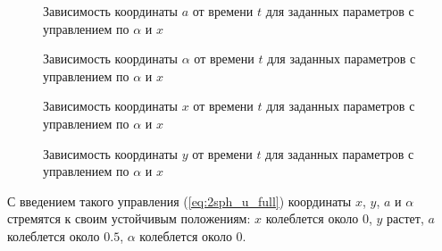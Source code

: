\begin{figure}[H]
	\caption{Зависимость координаты $a$ от времени $t$ для заданных параметров с управлением по $\alpha$ и $x$}
	\label{ris:2sph_a_full_u}
\end{figure}
\begin{figure}[H]
	\caption{Зависимость координаты $\alpha$ от времени $t$ для заданных параметров с управлением по $\alpha$ и $x$}
	\label{ris:2sph_alpha_full_u}
\end{figure} 
\begin{figure}[H]
	\caption{Зависимость координаты $x$ от времени $t$ для заданных параметров с управлением по $\alpha$ и $x$}
	\label{ris:2sph_x_full_u}
\end{figure} 
\begin{figure}[H]
	\caption{Зависимость координаты $y$ от времени $t$ для заданных параметров с управлением по $\alpha$ и $x$}
	\label{ris:2sph_y_full_u}
\end{figure} 

С введением такого управления (\ref{eq:2sph_u_full}) координаты $x$, $y$, $a$ и $\alpha$ стремятся к своим устойчивым положениям: $x$ колеблется около 0, $y$ растет,  $a$ колеблется около $0.5$, $\alpha$ колеблется около 0.
